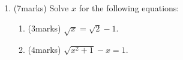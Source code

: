 \documentclass[12pt]{article}
\begin{document}
\begin{enumerate}
        \hrulefill

        \hrulefill

        \hrulefill

        \hrulefill

        \hrulefill

        \hrulefill

        \hrulefill

        \hrulefill

        \hrulefill

        \hrulefill

        \hrulefill

        \hrulefill

        \hrulefill

        \hrulefill

        \hrulefill

        \hrulefill

        \hrulefill

        \hrulefill

        \hrulefill

        \hrulefill

        \hrulefill

        \hrulefill
        \item (7marks) Solve $x$ for the following equations:\begin{enumerate}
            \item (3marks) $\sqrt{x}=\sqrt{2}-1$.
            \item (4marks) $\sqrt{x^2+1}-x=1$.
        \end{enumerate}

        \hrulefill

        \hrulefill

        \hrulefill

        \hrulefill

        \hrulefill

        \hrulefill

        \hrulefill

        \hrulefill

        \hrulefill

        \hrulefill

        \hrulefill

        \hrulefill

        \hrulefill

        \hrulefill

        \hrulefill


\end{enumerate}
\end{document}

